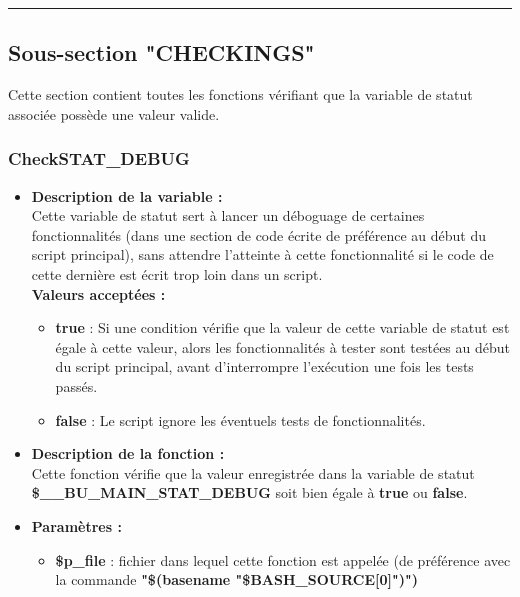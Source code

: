 \documentclass[a4paper,10pt]{article}
\begin{document}
\color{green}\par\noindent\rule{\textwidth}{0.4pt}\color{white}

\color{green}
\subsection{Sous-section "CHECKINGS"}\color{white}

Cette section contient toutes les fonctions vérifiant que la variable de statut associée possède une valeur valide.

\color{blue}
\subsubsection{CheckSTAT\_DEBUG}\color{white}

\begin{itemize}
    \item \textbf{Description de la variable :}\\
    Cette variable de statut sert à lancer un déboguage de certaines fonctionnalités (dans une section de code écrite de préférence au début du script principal), sans attendre l'atteinte à cette fonctionnalité si le code de cette dernière est écrit trop loin dans un script.\\[1\baselineskip]
    
    \textbf{Valeurs acceptées :}
    \begin{itemize}
        \item \textbf{true} : Si une condition vérifie que la valeur de cette variable de statut est égale à cette valeur, alors les fonctionnalités à tester sont testées au début du script principal, avant d'interrompre l'exécution une fois les tests passés.\\[1\baselineskip]

        \item \textbf{false} : Le script ignore les éventuels tests de fonctionnalités.\\[1\baselineskip]
    \end{itemize}

    \item \textbf{Description de la fonction :}\\
        Cette fonction vérifie que la valeur enregistrée dans la variable de statut \textbf{\color{orange}\$\_\_BU\_MAIN\_STAT\_DEBUG} soit bien égale à \textbf{true} ou \textbf{false}.\\[1\baselineskip]

    \item \textbf{Paramètres :}
    \begin{itemize}
        \item \color{orange}\textbf{\$p\_file}\color{white} : fichier dans lequel cette fonction est appelée (de préférence avec la commande \textbf{\textbf{"\$(\color{gray}basename \color{white}"\color{orange}\$BASH\_SOURCE[0]\color{white}")")}}\\[1\baselineskip]


\end{itemize}
\end{itemize}
\end{document}
